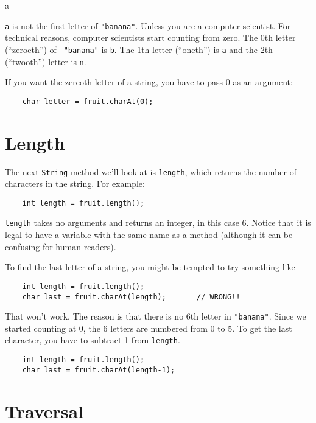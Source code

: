 \begin{verbatimtab}
a
\end{verbatimtab}
%
{\tt a} is not the first letter of {\tt "banana"}.  Unless you are a
computer scientist.  For technical reasons, computer scientists
start counting from zero.  The 0th letter (``zeroeth'') of {\tt
"banana"} is {\tt b}.  The 1th letter (``oneth'') is {\tt a} and the
2th (``twooth'') letter is {\tt n}.

If you want the zereoth letter of a string, you have to pass
0 as an argument:

\begin{lstlisting}
    char letter = fruit.charAt(0);
\end{lstlisting}


\section{Length}

The next {\tt String} method we'll look at is {\tt length}, which
returns the number of characters in the string.  For example:

\begin{lstlisting}
    int length = fruit.length();
\end{lstlisting}
%
{\tt length} takes no arguments
and returns an integer, in this case 6.  Notice that it is
legal to have a variable with the same name as a method (although
it can be confusing for human readers).

To find the last letter of a string, you might be tempted to
try something like

\begin{lstlisting}
    int length = fruit.length();
    char last = fruit.charAt(length);       // WRONG!!
\end{lstlisting}
%
That won't work.  The reason is that there is no 6th letter
in {\tt "banana"}.  Since we started counting at 0, the 6
letters are numbered from 0 to 5.  To get the last character,
you have to subtract 1 from {\tt length}.

\begin{lstlisting}
    int length = fruit.length();
    char last = fruit.charAt(length-1);
\end{lstlisting}


\section{Traversal}
\label{traverse}

